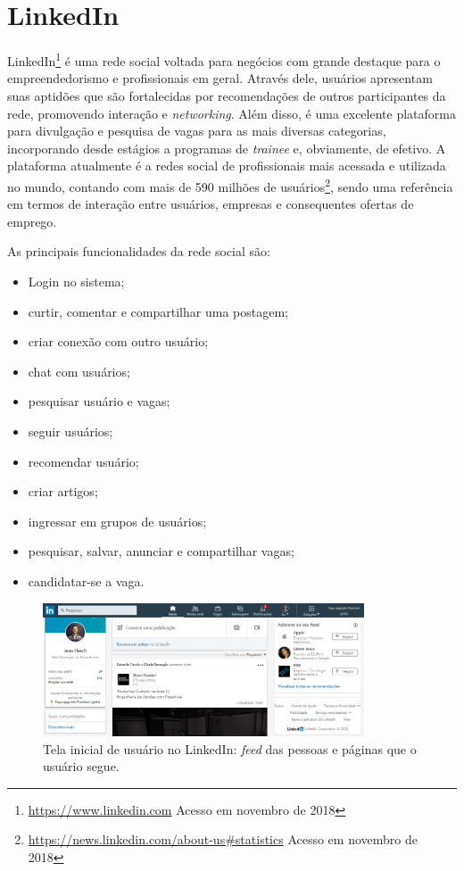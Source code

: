 \section{LinkedIn}
\label{trabRelLinkedin}

LinkedIn\footnote{{\url{https://www.linkedin.com} Acesso em novembro de 2018}} é uma rede social voltada para negócios com grande destaque para o empreendedorismo e profissionais em geral. Através dele, usuários apresentam suas aptidões que são fortalecidas por recomendações de outros participantes da rede, promovendo interação e \textit{networking}. Além disso, é uma excelente plataforma para divulgação e pesquisa de vagas para as mais diversas categorias, incorporando desde estágios a programas de \textit{trainee} e, obviamente, de efetivo. A plataforma atualmente é a redes social de profissionais mais acessada e utilizada no mundo, contando com mais de 590 milhões de usuários\footnote{{\url{https://news.linkedin.com/about-us\#statistics} Acesso em novembro de 2018}}, sendo uma referência em termos de interação entre usuários, empresas e consequentes ofertas de emprego.

As principais funcionalidades da rede social são:
\begin{itemize}
    \item Login no sistema;
    \item curtir, comentar e compartilhar uma postagem;
    \item criar conexão com outro usuário;
    \item chat com usuários;
    \item pesquisar usuário e vagas;
    \item seguir usuários;
    \item recomendar usuário;
    \item criar artigos;
    \item ingressar em grupos de usuários;
    \item pesquisar, salvar, anunciar e compartilhar vagas;
    \item candidatar-se a vaga.
\end{itemize}

\begin{figure}[h]
    \caption{Tela inicial de usuário no LinkedIn: \textit{feed} das pessoas e páginas que o usuário segue.}
       	\begin{center}
            \includegraphics[width=0.85\textwidth]{figuras/rel05.png}
        \end{center}
    \label{telaHomeLKDIN}
\end{figure}

